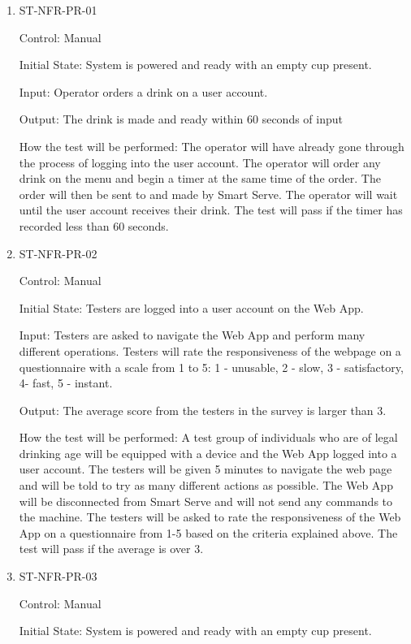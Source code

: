 \documentclass[12pt, titlepage]{article}
\begin{document}
\begin{enumerate}

\item{ST-NFR-PR-01\\}

Control: Manual

Initial State: System is powered and ready with an empty cup present.

Input: Operator orders a drink on a user account.

Output: The drink is made and ready within 60 seconds of input

How the test will be performed: The operator will have already gone through the process of logging into the user account. The operator will order any drink on the menu and begin a timer at the same time of the order. The order will then be sent to and made by Smart Serve. The operator will wait until the user account receives their drink. The test will pass if the timer has recorded less than 60 seconds.
					
\item{ST-NFR-PR-02\\}

Control: Manual

Initial State: Testers are logged into a user account on the Web App.

Input: Testers are asked to navigate the Web App and perform many different operations. Testers will rate the responsiveness of the webpage on a questionnaire with a scale from 1 to 5: 1 - unusable, 2 - slow, 3 - satisfactory, 4- fast, 5 - instant.

Output: The average score from the testers in the survey is larger than 3.

How the test will be performed: A test group of individuals who are of legal drinking age will be equipped with a device and the Web App logged into a user account. The testers will be given 5 minutes to navigate the web page and will be told to try as many different actions as possible. The Web App will be disconnected from Smart Serve and will not send any commands to the machine. The testers will be asked to rate the responsiveness of the Web App on a questionnaire from 1-5 based on the criteria explained above. The test will pass if the average is over 3.

\item{ST-NFR-PR-03\\}

Control: Manual

Initial State: System is powered and ready with an empty cup present.


\end{enumerate}
\end{document}
